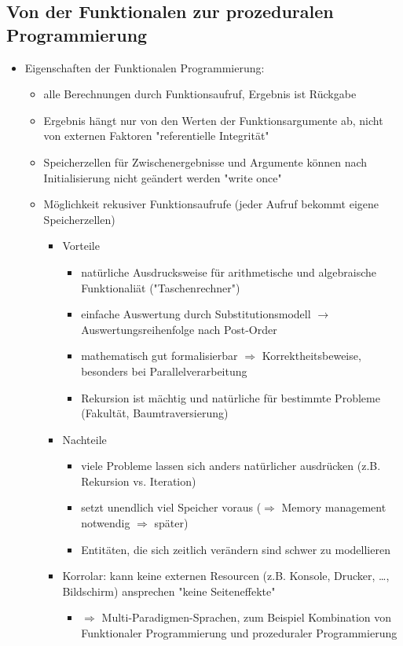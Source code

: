 \documentclass[a4paper]{scrartcl}
\begin{document}
\subsection{Von der Funktionalen zur prozeduralen Programmierung}
\label{sec-9-1}
\begin{itemize}
\item Eigenschaften der Funktionalen Programmierung:
\begin{itemize}
\item alle Berechnungen durch Funktionsaufruf, Ergebnis ist Rückgabe
\item Ergebnis hängt nur von den Werten der Funktionsargumente ab, nicht von externen Faktoren "referentielle Integrität"
\item Speicherzellen für Zwischenergebnisse und Argumente können nach Initialisierung nicht geändert werden "write once"
\item Möglichkeit rekusiver Funktionsaufrufe (jeder Aufruf bekommt eigene Speicherzellen)
\begin{itemize}
\item Vorteile
\begin{itemize}
\item natürliche Ausdrucksweise für arithmetische und algebraische Funktionaliät ("Taschenrechner")
\item einfache Auswertung durch Substitutionsmodell $\rightarrow$ Auswertungsreihenfolge nach Post-Order
\item mathematisch gut formalisierbar $\Rightarrow$ Korrektheitsbeweise, besonders bei Parallelverarbeitung
\item Rekursion ist mächtig und natürliche für bestimmte Probleme (Fakultät, Baumtraversierung)
\end{itemize}
\item Nachteile
\begin{itemize}
\item viele Probleme lassen sich anders natürlicher ausdrücken (z.B. Rekursion vs. Iteration)
\item setzt unendlich viel Speicher voraus ($\Rightarrow$ Memory management notwendig $\Rightarrow$ später)
\item Entitäten, die sich zeitlich verändern sind schwer zu modellieren
\end{itemize}
\item Korrolar: kann keine externen Resourcen (z.B. Konsole, Drucker, \ldots, Bildschirm) ansprechen "keine Seiteneffekte"
\begin{itemize}
\item $\Rightarrow$ Multi-Paradigmen-Sprachen, zum Beispiel Kombination von Funktionaler Programmierung und prozeduraler Programmierung
\end{itemize}
\end{itemize}
\end{itemize}
\end{itemize}
\end{document}
